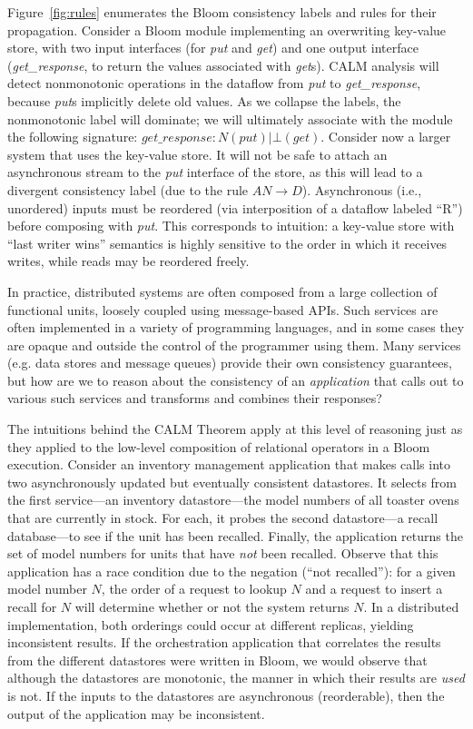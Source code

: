 Figure~\ref{fig:rules} enumerates the Bloom consistency labels and rules for their propagation.
Consider a Bloom module implementing an overwriting key-value store, with two input interfaces (for
\emph{put} and \emph{get}) and one output interface (\emph{get\_response}, to return the values associated
with \emph{get}s).  CALM analysis will detect nonmonotonic operations in the dataflow from \emph{put}
to \emph{get\_response}, because \emph{put}s implicitly delete old values.  As we collapse the labels,
the nonmonotonic label will dominate; we will ultimately associate with the module the following signature:
$get\_response: N(put) | \bot(get)$.
Consider now a larger system that uses the key-value store.  It will not be safe to attach an asynchronous
stream to the \emph{put} interface of the store, as this will lead to a divergent consistency label
(due to the rule $AN \rightarrow D$).  Asynchronous (i.e., unordered) inputs must be reordered (via
interposition of a dataflow labeled ``R'') before composing with \emph{put}.  This corresponds to intuition:
a key-value store with ``last writer wins'' semantics is highly sensitive to the order in which it receives writes,
while reads may be reordered freely.


In practice, distributed systems are often composed from a large 
collection of functional units, loosely coupled using message-based APIs.
Such services are often implemented in a variety of programming 
languages, and in some cases they are opaque and outside the control of
the programmer using them.  
Many services (e.g. data stores and message queues) provide their own 
consistency guarantees, but how are we to reason about the consistency of an
\emph{application} that calls out to various such services and transforms
and combines their responses?  

The intuitions behind the CALM Theorem apply at this level of reasoning
just as they applied to the low-level composition of relational operators
in a Bloom execution.  Consider an inventory management application 
that makes calls into two asynchronously updated but
eventually consistent datastores.  It selects from the first service---an 
inventory datastore---the model numbers of all toaster ovens that are currently in stock.  For each, it probes the second datastore---a recall database---to
see if the unit has been recalled.  Finally, the application returns the 
set of model numbers for units that have \emph{not} been recalled.  Observe that this
application has a race condition due to the negation (``not recalled''): for a given model number $N$, the order of a request to lookup $N$ and a request to insert a recall for $N$ will determine whether or not the system returns $N$.  In a distributed implementation, both orderings could occur at different replicas, yielding inconsistent results.  If the orchestration
application that correlates the results from the different datastores were written in Bloom, we would observe that although the datastores are monotonic, 
the manner in which their results are \emph{used} is not.  If the inputs to 
the datastores are asynchronous (reorderable), then the output of the 
application may be inconsistent.


